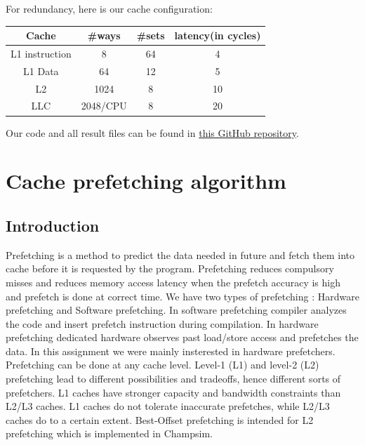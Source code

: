 \documentclass[a4paper]{article}
\begin{document}
    For redundancy, here is our cache configuration:
    \begin{center}
        \begin{table}[h]
            \begin{tabular}{|c|c|c|c|}
            \hline
            \textbf{Cache}          & \textbf{\#ways}   & \textbf{\#sets} & \textbf{latency(in cycles)} \\ \hline
            L1 instruction & 8        & 64     & 4                  \\ \hline
            L1 Data        & 64       & 12     & 5                  \\ \hline
            L2             & 1024     & 8      & 10                 \\ \hline
            LLC            & 2048/CPU & 8      & 20                 \\ \hline
            \end{tabular}
        \end{table}
    \end{center}
    
    Our code and all result files can be found in \href{https://github.com/vsdevaraddi/PA_Champsim_assignment}{this GitHub repository}.

\pagebreak
\section{Cache prefetching algorithm}
 \subsection{Introduction}
    Prefetching is a method to predict the data needed in future and fetch them into cache before it is requested by the program. Prefetching reduces compulsory misses and reduces memory access latency when the prefetch accuracy is high and prefetch is done at correct time. We have two types of prefetching : Hardware prefetching and Software prefetching. In software prefetching compiler analyzes the code and insert prefetch instruction during compilation. In hardware prefetching dedicated hardware observes past load/store access and prefetches the data. In this assignment we were mainly insterested in hardware prefetchers. Prefetching can be done at any cache level. Level-1 (L1)
    and level-2 (L2) prefetching lead to different possibilities and
    tradeoffs, hence different sorts of prefetchers. L1 caches have stronger capacity and bandwidth constraints than L2/L3 caches. L1 caches do not tolerate inaccurate prefetches, while L2/L3 caches do to a certain extent. Best-Offset prefetching is intended for L2 prefetching which is implemented in Champsim.
    
\end{document}
